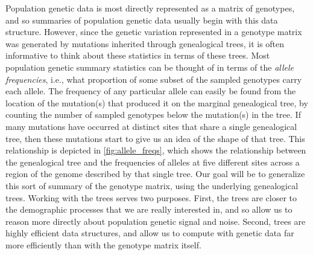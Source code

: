 \documentclass[9pt,twoside,lineno]{gsajnl}
\begin{document}
Population genetic data is most directly represented as a matrix of genotypes,
and so summaries of population genetic data usually begin with this data structure.
However, since the genetic variation represented in a genotype matrix
was generated by mutations inherited through genealogical trees,
it is often informative to think about these statistics in terms of these trees.
Most population genetic summary statistics can be thought of in terms of the \emph{allele frequencies},
i.e., what proportion of some subset of the sampled genotypes carry each allele.
The frequency of any particular allele
can easily be found from the location of the mutation(s) that produced it
on the marginal genealogical tree,
by counting the number of sampled genotypes below the mutation(s) in the tree.
If many mutations have occurred at distinct sites that share a single genealogical tree,
then these mutations start to give us an idea of the shape of that tree.
This relationship is depicted in \autoref{fig:allele_freqs},
which shows the relationship between the genealogical tree
and the frequencies of alleles at five different sites across a region of the genome
described by that single tree.
Our goal will be to generalize this sort of summary of the genotype matrix,
using the underlying genealogical trees.
Working with the trees serves two purposes.
First, the trees are closer to the demographic processes that we are really interested in,
and so allow us to reason more directly about population genetic signal and noise.
Second, trees are highly efficient data structures,
and allow us to compute with genetic data far more efficiently than with the genotype matrix itself.
\end{document}
